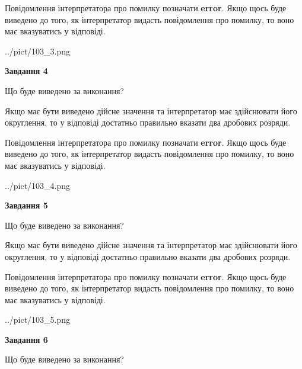 \documentclass[12pt, ukrainian]{article}
\begin{document}
{\begin {Large}
Повідомлення інтерпретатора про помилку позначати \textbf{error}.
Якщо щось буде виведено до того, як інтерпретатор видасть повідомлення про помилку, 
то воно має вказуватись у відповіді. \par

\begin{center}
	{../pict/103_3.png}
\end{center}
\newpage

{\begin {center}\textbf{Завдання 4}\end {center}}\par
Що буде виведено за виконання? \par

Якщо має бути виведено дійсне значення та інтерпретатор має здійснювати його округлення, 
то у відповіді достатньо правильно вказати два дробових розряди.

Повідомлення інтерпретатора про помилку позначати \textbf{error}.
Якщо щось буде виведено до того, як інтерпретатор видасть повідомлення про помилку, 
то воно має вказуватись у відповіді. \par

\begin{center}
	{../pict/103_4.png}
\end{center}
\newpage

{\begin {center}\textbf{Завдання 5}\end {center}}\par
Що буде виведено за виконання? \par

Якщо має бути виведено дійсне значення та інтерпретатор має здійснювати його округлення, 
то у відповіді достатньо правильно вказати два дробових розряди.

Повідомлення інтерпретатора про помилку позначати \textbf{error}.
Якщо щось буде виведено до того, як інтерпретатор видасть повідомлення про помилку, 
то воно має вказуватись у відповіді. \par

\begin{center}
	{../pict/103_5.png}
\end{center}
\newpage

{\begin {center}\textbf{Завдання 6}\end {center}}\par
Що буде виведено за виконання? \par


\end{Large}}
\end{document}
